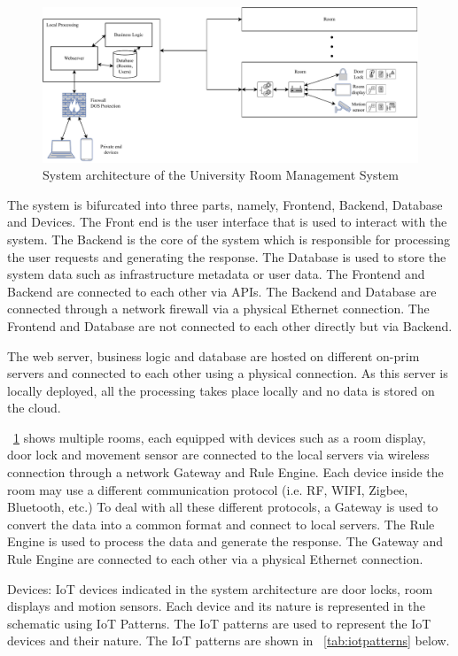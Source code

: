 \documentclass[conference,onecolumn]{IEEEtran}
\begin{document}
	\begin{figure}[H]
		\centering
		\includegraphics[width=1\textwidth]{Figures/SystemArchitecture.pdf}
		\caption{System architecture of the University Room Management System}
		\label{fig:systemarchitecture}
	\end{figure}

	The system is bifurcated into three parts, namely, Frontend, Backend, Database and Devices. The Front end is the user interface that is used to interact with the system. The Backend is the core of the system which is responsible for processing the user requests and generating the response. The Database is used to store the system data such as infrastructure metadata or user data. The Frontend and Backend are connected to each other via APIs. The Backend and Database are connected through a network firewall via a physical Ethernet connection. The Frontend and Database are not connected to each other directly but via Backend. 

	The web server, business logic and database are hosted on different on-prim servers and connected to each other using a physical connection. As this server is locally deployed, all the processing takes place locally and no data is stored on the cloud.

	\figurename~\ref{fig:systemarchitecture} shows multiple rooms, each equipped with devices such as a room display, door lock and movement sensor are connected to the local servers via wireless connection through a network Gateway and Rule Engine. Each device inside the room may use a different communication protocol (i.e. RF, WIFI, Zigbee, Bluetooth, etc.) To deal with all these different protocols, a Gateway is used to convert the data into a common format and connect to local servers. The Rule Engine is used to process the data and generate the response. The Gateway and Rule Engine are connected to each other via a physical Ethernet connection.

	Devices: 
	IoT devices indicated in the system architecture are door locks, room displays and motion sensors. Each device and its nature is represented in the schematic using IoT Patterns. The IoT patterns are used to represent the IoT devices and their nature. The IoT patterns are shown in \tablename~\ref{tab:iotpatterns} below.
\end{document}

